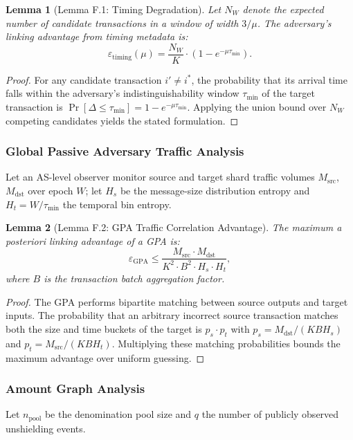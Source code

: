 \documentclass[sigconf,nonacm]{acmart}
\newtheorem{lemma}{Lemma}
\begin{document}
\begin{lemma}[Lemma F.1: Timing Degradation]\label{lem:timing}
Let $N_W$ denote the expected number of candidate transactions in a window of width $3/\mu$. The adversary's linking advantage from timing metadata is:
\begin{equation}
\varepsilon_{\text{timing}}(\mu) = \frac{N_W}{K} \cdot (1 - e^{-\mu \tau_{\min}}).
\end{equation}
\end{lemma}

\begin{proof}
For any candidate transaction $i' \neq i^*$, the probability that its arrival time falls within the adversary's indistinguishability window $\tau_{\min}$ of the target transaction is $\Pr[\Delta \le \tau_{\min}] = 1 - e^{-\mu \tau_{\min}}$. Applying the union bound over $N_W$ competing candidates yields the stated formulation.
\end{proof}

\subsubsection{Global Passive Adversary Traffic Analysis}
Let an AS-level observer monitor source and target shard traffic volumes $M_{\text{src}}$, $M_{\text{dst}}$ over epoch $W$; let $H_s$ be the message-size distribution entropy and $H_t = W/\tau_{\min}$ the temporal bin entropy.

\begin{lemma}[Lemma F.2: GPA Traffic Correlation Advantage]\label{lem:gpa}
The maximum a posteriori linking advantage of a GPA is:
\begin{equation}
\varepsilon_{\text{GPA}} \le \frac{M_{\text{src}} \cdot M_{\text{dst}}}{K^2 \cdot B^2 \cdot H_s \cdot H_t},
\end{equation}
where $B$ is the transaction batch aggregation factor.
\end{lemma}

\begin{proof}
The GPA performs bipartite matching between source outputs and target inputs. The probability that an arbitrary incorrect source transaction matches both the size and time buckets of the target is $p_s \cdot p_t$ with $p_s = M_{\text{dst}} / (K B H_s)$ and $p_t = M_{\text{src}} / (K B H_t)$. Multiplying these matching probabilities bounds the maximum advantage over uniform guessing.
\end{proof}

\subsubsection{Amount Graph Analysis}
Let $n_{\text{pool}}$ be the denomination pool size and $q$ the number of publicly observed unshielding events.
\end{document}
